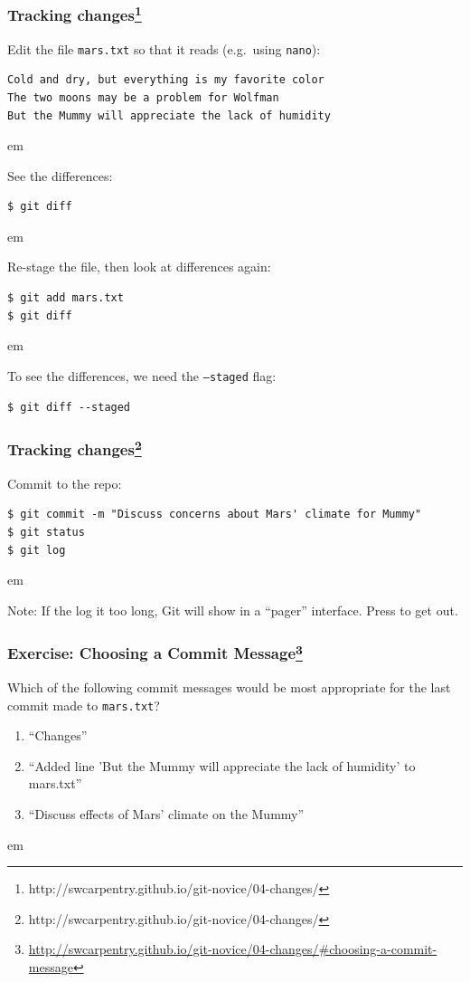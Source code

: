 \documentclass{beamer}
\newcommand{\correctans}{\textcolor{green!50!black}{\CheckmarkBold}}
\newcommand{\wrongans}{\textcolor{red!50!black}{\XSolidBold}}
\begin{document}
\begin{frame}[fragile]
  \frametitle{Tracking changes\footnote{http://swcarpentry.github.io/git-novice/04-changes/}}

Edit the file \texttt{mars.txt} so that it reads (e.g.~using \texttt{nano}):
\begin{verbatim}
Cold and dry, but everything is my favorite color
The two moons may be a problem for Wolfman
But the Mummy will appreciate the lack of humidity
\end{verbatim}
 em
\pause

See the differences:
\begin{verbatim}
$ git diff
\end{verbatim}
 em
\pause

Re-stage the file, then look at differences again:
\begin{verbatim}
$ git add mars.txt
$ git diff
\end{verbatim}
 em
\pause

To see the differences, we need the \texttt{--staged} flag:
\begin{verbatim}
$ git diff --staged
\end{verbatim}

\end{frame}

\begin{frame}[fragile]
  \frametitle{Tracking changes\footnote{http://swcarpentry.github.io/git-novice/04-changes/}}


Commit to the repo:
\begin{verbatim}
$ git commit -m "Discuss concerns about Mars' climate for Mummy"
$ git status
$ git log
\end{verbatim}
 em
\pause

Note: If the log it too long, Git will show in a ``pager'' interface. Press  to get out.

\end{frame}



\begin{frame}[fragile]
\frametitle{Exercise: Choosing a Commit Message\footnote{\url{http://swcarpentry.github.io/git-novice/04-changes/\#choosing-a-commit-message}}}

Which of the following commit messages would be most appropriate for the last commit made to \texttt{mars.txt}?

\begin{enumerate}
  \item ``Changes'' \onslide<2->{\wrongans}
  \item ``Added line 'But the Mummy will appreciate the lack of humidity' to mars.txt'' \onslide<2->{\wrongans}
  \item ``Discuss effects of Mars’ climate on the Mummy'' \onslide<2->{\correctans}
\end{enumerate}

 em


\end{frame}
\end{document}
